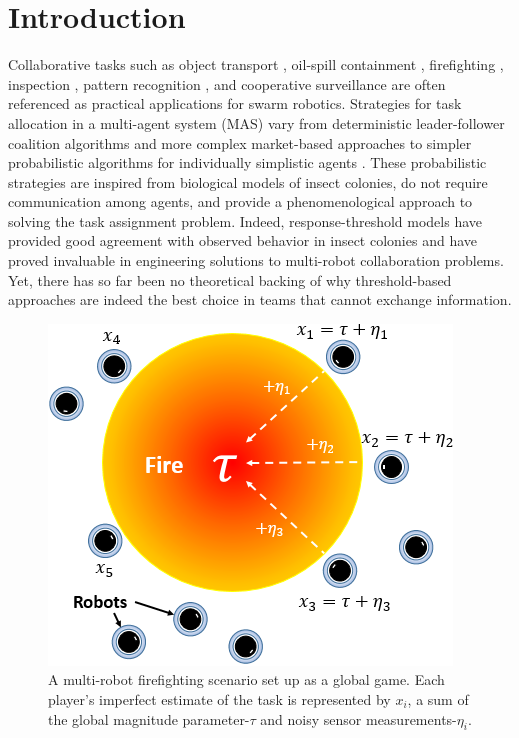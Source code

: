 \documentclass[conference]{ieeeconf}
\begin{document}
\section{Introduction}\label{sec:intro}
Collaborative tasks such as object transport \cite{Sugawara2012}, oil-spill containment \cite{Beni2005}, firefighting \cite{Kanakia2014}, inspection \cite{Correll2008}, pattern recognition \cite{Beni1993}, and cooperative surveillance are often referenced as practical applications for swarm robotics. Strategies for task allocation \cite{Gerkey2004} in a multi-agent system (MAS) vary from deterministic leader-follower coalition algorithms \cite{Chen2011} and more complex market-based approaches \cite{Amstutz2008} to simpler probabilistic algorithms for individually simplistic agents \cite{Dantu2012}. These probabilistic strategies are inspired from biological models of insect colonies, do not require communication among agents, and provide a phenomenological approach to solving the task assignment problem. Indeed, response-threshold models have provided good agreement with observed behavior in insect colonies and have proved invaluable in engineering solutions to multi-robot collaboration problems. Yet, there has so far been no theoretical backing of why threshold-based approaches are indeed the best choice in teams that cannot exchange information.

\begin{figure}[!htb]
\centering\includegraphics[width=0.9\columnwidth]{../figures/globalgamesetup.png}
\centering\caption{A multi-robot firefighting scenario set up as a global game. Each player's imperfect estimate of the task is represented by $x_i$, a sum of the global magnitude parameter-$\tau$ and noisy sensor measurements-$\eta_i$.}\label{fig:ggsetup}
\end{figure}
\end{document}
